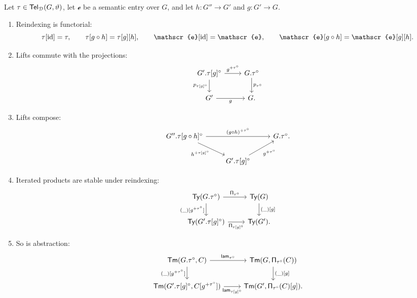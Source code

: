 \begin{lemma}\label{lem:semantic-telescopes}
    Let $\tau \in \mathsf{Tel}_{\mathcal{D}}(G, \vartheta)$, let $\mathscr{e}$ be a semantic entry over $G$, and let $h : G'' \to G'$ and $g : G' \to G$.
    \begin{enumerate}
        \item Reindexing is functorial:
        \[
            \tau[\id] = \tau, \qquad \tau[g \circ h] = \tau[g][h], \qquad \mathscr{e}[\id] = \mathscr{e}, \qquad \mathscr{e}[g \circ h] = \mathscr{e}[g][h].
        \]
        \item Lifts commute with the projections:
        \[\begin{tikzcd}
            {G'.\tau[g]^{\circ}} & {G.\tau^{\circ}} \\
            {G'} & G.
            \arrow["{g^{+\tau^{\circ}}}", from=1-1, to=1-2]
            \arrow["{p_{\tau[g]^{\circ}}}"', from=1-1, to=2-1]
            \arrow["{p_{\tau^{\circ}}}", from=1-2, to=2-2]
            \arrow["g"', from=2-1, to=2-2]
        \end{tikzcd}\]
        \item Lifts compose:
        \[\begin{tikzcd}
            {G''.\tau[g \circ h]^{\circ}} && {G.\tau^{\circ}.} \\
            & {G'.\tau[g]^{\circ}}
            \arrow["{(g \circ h)^{+\tau^{\circ}}}", from=1-1, to=1-3]
            \arrow["{h^{+\tau[g]^{\circ}}}"', from=1-1, to=2-2]
            \arrow["{g^{+\tau^{\circ}}}"', from=2-2, to=1-3]
        \end{tikzcd}\]
        \item Iterated products are stable under reindexing:
        \[\begin{tikzcd}
            {\Ty(G.\tau^{\circ})} & {\Ty(G)} \\
            {\Ty(G'.\tau[g]^{\circ})} & {\Ty(G').}
            \arrow["{\PiT_{\tau^{\circ}}}", from=1-1, to=1-2]
            \arrow["{(\_)[g^{+\tau^{\circ}}]}"', from=1-1, to=2-1]
            \arrow["{(\_)[g]}", from=1-2, to=2-2]
            \arrow["{\PiT_{\tau[g]^{\circ}}}"', from=2-1, to=2-2]
        \end{tikzcd}\]
        \item So is abstraction:
        \[\begin{tikzcd}
            {\Tm(G.\tau^{\circ}, C)} & {\Tm(G, \PiT_{\tau^{\circ}}(C))} \\
            {\Tm(G'.\tau[g]^{\circ}, C[g^{+\tau^{\circ}}])} & {\Tm(G', \PiT_{\tau^{\circ}}(C)[g]).}
            \arrow["{\lam_{\tau^{\circ}}}", from=1-1, to=1-2]
            \arrow["{(\_)[g^{+\tau^{\circ}}]}"', from=1-1, to=2-1]
            \arrow["{(\_)[g]}", from=1-2, to=2-2]
            \arrow["{\lam_{\tau[g]^{\circ}}}"', from=2-1, to=2-2]
        \end{tikzcd}\]
    \end{enumerate}
\end{lemma}

